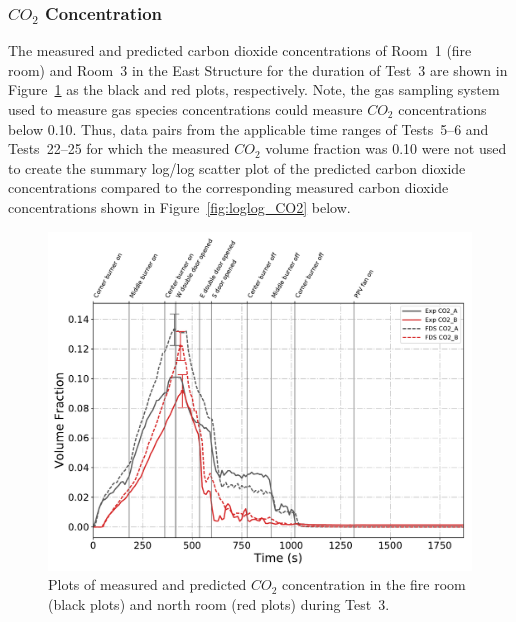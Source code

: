 \subsubsection*{\textit{$CO_2$} Concentration}
The measured and predicted carbon dioxide concentrations of Room~1 (fire room) and Room~3 in the East Structure for the duration of Test~3 are shown in Figure~\ref{fig:Test3_CO2} as the black and red plots, respectively. Note, the gas sampling system used to measure gas species concentrations could measure $CO_2$ concentrations below 0.10. Thus, data pairs from the applicable time ranges of Tests~5--6 and Tests~22--25 for which the measured $CO_2$ volume fraction was 0.10 were not used to create the summary log/log scatter plot of the predicted carbon dioxide concentrations compared to the corresponding measured carbon dioxide concentrations shown in Figure~\ref{fig:loglog_CO2} below.
\begin{figure}[!h]
	\centering
	\includegraphics[width=\columnwidth]{Figures/Plots/Validation/Gas_Concentration/Test_3_CO2}
	\caption[Plots of measured and predicted $CO_2$ concentration during Test~3.]{Plots of measured and predicted $CO_2$ concentration in the fire room (black plots) and north room (red plots) during Test~3.}
	\label{fig:Test3_CO2}
\end{figure}

